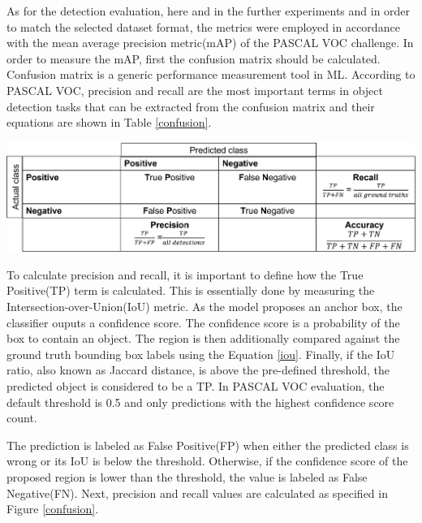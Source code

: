 \documentclass[english, 12pt, a4paper, elec, utf8, a-1b, online]{aaltothesis}
\begin{document}
As for the detection evaluation, here and in the further experiments and in order to match the selected dataset format, the metrics were employed in accordance with the mean average precision metric(mAP) of the PASCAL VOC \cite{Everingham10} challenge. In order to measure the mAP, first the confusion matrix should be calculated. Confusion matrix is a generic performance measurement tool in ML. According to PASCAL VOC, precision and recall are the most important terms in object detection tasks that can be extracted from the confusion matrix and their equations are shown in Table \ref{confusion}.

\begin{table}[htb]
	\begin{center}
		\includegraphics[width=14cm]{./confusion.png}
	\end{center}
	\begin{center}
		\label{confusion}
	\end{center}
\end{table}
\FloatBarrier


To calculate precision and recall, it is important to define how the True Positive(TP) term is calculated. This is essentially done by measuring the  Intersection-over-Union(IoU) metric. As the model proposes an anchor box, the classifier ouputs a confidence score. The confidence score is a probability of the box to contain an object. The region is then additionally compared against the ground truth bounding box labels using the Equation \ref{iou}. Finally, if the IoU ratio, also known as Jaccard distance, is above the pre-defined threshold, the predicted object is considered to be a TP. In PASCAL VOC evaluation, the default threshold is 0.5 \cite{mAp_blog} and only predictions with the highest confidence score count. 

The prediction is labeled as False Positive(FP) when either the predicted class is wrong or its IoU is below the threshold. Otherwise, if the confidence score of the proposed region is lower than the threshold, the value is labeled as False Negative(FN). Next, precision and recall values are calculated as specified in Figure \ref{confusion}.
\end{document}
